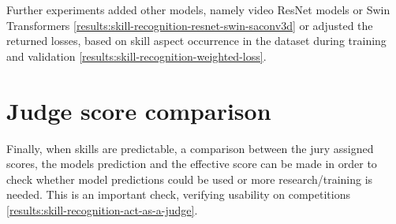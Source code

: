 Further experiments added other models, namely video ResNet models or Swin Transformers \ref{results:skill-recognition-resnet-swin-saconv3d} or adjusted the returned losses, based on skill aspect occurrence in the dataset during training and validation \ref{results:skill-recognition-weighted-loss}.

\section{Judge score comparison}
\label{methodology:judge-score-comparison}

Finally, when skills are predictable, a comparison between the jury assigned scores, the models prediction and the effective score can be made in order to check whether model predictions could be used or more research/training is needed. This is an important check, verifying usability on competitions \ref{results:skill-recognition-act-as-a-judge}.

